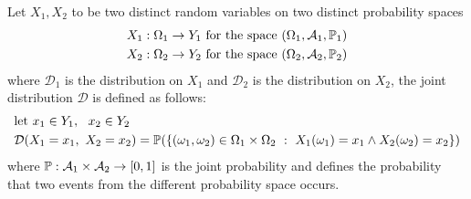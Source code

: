 \documentclass[10pt, letterpaper]{report}
\begin{document}
Let $X_1,X_2$ to be two distinct random variables on two distinct probability spaces\begin{align}
	 & X_1:\Omega_1\rightarrow Y_1 \text{ for the space }(\Omega_1,\mathcal A_1,{\mathbb P}_1) \\
	 & X_2:\Omega_2\rightarrow Y_2 \text{ for the space }(\Omega_2,\mathcal A_2,{\mathbb P}_2)
\end{align}
where $\mathcal D_1$ is the distribution on $X_1$ and $\mathcal D_2$ is the distribution on $X_2$, the joint distribution $\mathcal D$ is defined as follows:\begin{align}
	 & \text{let }x_1\in Y_1, \ \ x_2\in Y_2                                                                                                 \\
	 & \mathcal D(X_1=x_1, \ X_2=x_2)=\Prob(\{(\omega_1,\omega_2)\in\Omega_1\times\Omega_2 \ : \ X_1(\omega_1)=x_1\land X_2(\omega_2)=x_2\})
\end{align}
where ${\mathbb P}:\mathcal A_1\times\mathcal A_2\rightarrow[0,1]$ is the joint probability and defines the probability that two events from the different probability space occurs.\bigskip
\end{document}
